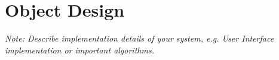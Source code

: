\chapter{Object Design}

\textit{Note: Describe implementation details of your system, e.g. User Interface implementation or important algorithms.}
